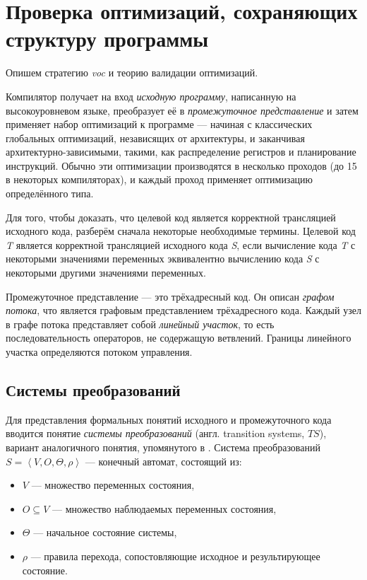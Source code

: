 \chapter{Проверка оптимизаций, сохраняющих структуру программы}

Опишем стратегию \emph{voc} и теорию валидации оптимизаций.

Компилятор получает на вход \emph{исходную программу}, написанную на высокоуровневом языке, преобразует её в \emph{промежуточное представление} и затем применяет набор оптимизаций к программе --- начиная с классических глобальных оптимизаций, независящих от архитектуры, и заканчивая архитектурно-зависимыми, такими, как распределение регистров и планирование инструкций. Обычно эти оптимизации производятся в несколько проходов (до 15 в некоторых компиляторах), и каждый проход применяет оптимизацию определённого типа.

Для того, чтобы доказать, что целевой код является корректной трансляцией исходного кода, разберём сначала некоторые необходимые термины. Целевой код \emph{T} является корректной трансляцией исходного кода \emph{S}, если вычисление кода \emph{T} с некоторыми значениями переменных эквивалентно вычислению кода \emph{S} с некоторыми другими значениями переменных.

Промежуточное представление --- это трёхадресный код. Он описан \emph{графом потока}, что является графовым представлением трёхадресного кода. Каждый узел в графе потока представляет собой \emph{линейный участок}, то есть последовательность операторов, не содержащую ветвлений. Границы линейного участка определяются потоком управления.

\section{Системы преобразований}

Для представления формальных понятий исходного и промежуточного кода вводится понятие \emph{системы преобразований} (англ. transition systems, $TS$), вариант аналогичного понятия, упомянутого в \cite{PSS98b}. Система преобразований $S = \left\langle  V, O, \Theta, \rho \right\rangle $ --- конечный автомат, состоящий из:
\begin{itemize}
\item $V$ --- множество переменных состояния,
\item $O \subseteq V$ --- множество наблюдаемых переменных состояния,
\item $\Theta$ --- начальное состояние системы,
\item $\rho$ --- правила перехода, сопостовляющие исходное и результирующее состояние.
\end{itemize}

